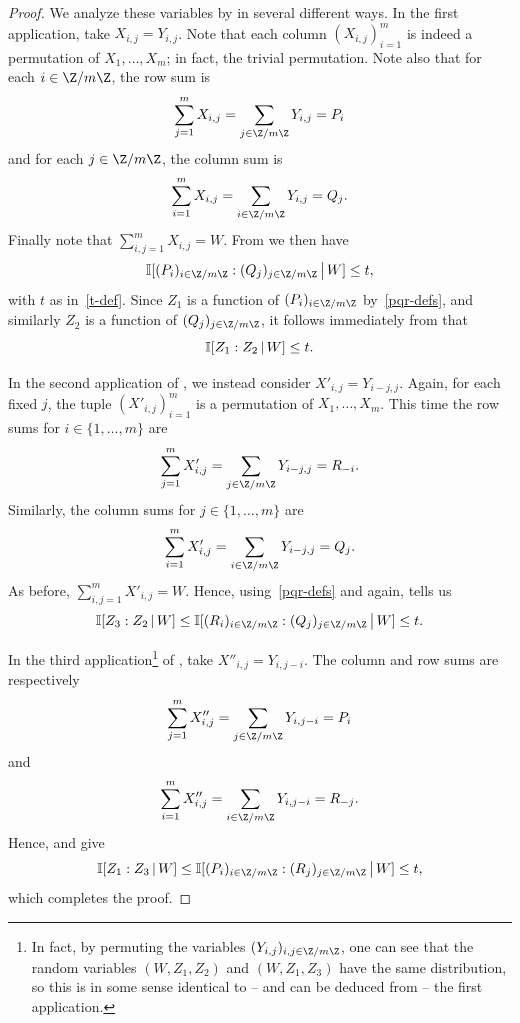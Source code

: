 \begin{proof}\leanok
  We analyze these variables by  in several different ways.
  In the first application, take $X_{i,j}=Y_{i,j}$.
  Note that each column $(X_{i,j})_{i=1}^m$ is indeed a permutation of $X_1,\dots,X_m$; in fact, the trivial permutation.
  Note also that for each $i \in \Z/m\Z$, the row sum is
  \[
    \sum_{j=1}^m X_{i,j} = \sum_{j \in \Z/m\Z} Y_{i,j} = P_i
  \]
  and for each $j \in \Z/m\Z$, the column sum is
  \[
    \sum_{i=1}^m X_{i,j} = \sum_{i \in \Z/m\Z} Y_{i,j} = Q_j.
  \]
  Finally note that $\sum_{i,j=1}^m X_{i,j} = W$.
  From  we then have
  \[
    \bbI[ (P_i)_{i \in \Z/m\Z} : (Q_j)_{j \in \Z/m\Z } \,\big|\, W ] \leq t,
  \]
  with $t$ as in~\eqref{t-def}.
  Since $Z_1$ is a function of $(P_i)_{i \in \Z/m\Z}$ by~\eqref{pqr-defs}, and similarly $Z_2$ is a function of $(Q_j)_{j \in \Z/m\Z}$, it follows immediately from  that
  \[
    \mathbb{I}[ Z_1 : Z_2 \,|\, W ] \leq t.
  \]

  In the second application of , we instead consider $X'_{i,j} = Y_{i-j,j}$.
  Again, for each fixed $j$, the tuple $(X'_{i,j})_{i=1}^m$ is a permutation of $X_1,\dots,X_m$.
  This time the row sums for $i \in \{1,\dots, m\}$ are
  \[
    \sum_{j=1}^m X'_{i,j} = \sum_{j \in \Z/m\Z} Y_{i-j,j} = R_{-i}.
  \]
 Similarly, the column sums for $j \in \{1,\dots, m\}$ are
  \[
    \sum_{i=1}^m X'_{i,j} = \sum_{i \in \Z/m\Z} Y_{i-j,j} = Q_j.
  \]
  As before, $\sum_{i,j=1}^m X'_{i,j} = W$.
  Hence, using~\eqref{pqr-defs} and  again,  tells us
  \[
    \bbI[ Z_3 :  Z_2 \,|\, W] \leq \bbI[ (R_i)_{i \in \Z/m\Z} : (Q_j)_{j \in \Z/m\Z } \,\big|\, W ] \leq t.
  \]

  In the third application\footnote{In fact, by permuting the variables $(Y_{i,j})_{i,j \in \Z/m\Z}$, one can see that the random variables $(W, Z_1, Z_2)$ and $(W, Z_1, Z_3)$ have the same distribution, so this is in some sense identical to -- and can be deduced from -- the first application.} of , take $X''_{i,j} = Y_{i,j-i}$.
  The column and row sums are respectively
  \[
    \sum_{j=1}^m X''_{i,j} = \sum_{j \in \Z/m\Z} Y_{i,j-i} = P_i \] and
\[     \sum_{i=1}^m X''_{i,j} = \sum_{i \in \Z/m\Z} Y_{i,j-i} = R_{-j}.
  \]
  Hence,  and  give
  \[
    \bbI[ Z_1 : Z_3 \,|\, W] \leq \bbI[ (P_i)_{i \in \Z/m\Z} : (R_j)_{j \in \Z/m\Z } \,\big|\, W ] \leq t,
  \]
  which completes the proof.
\end{proof}


